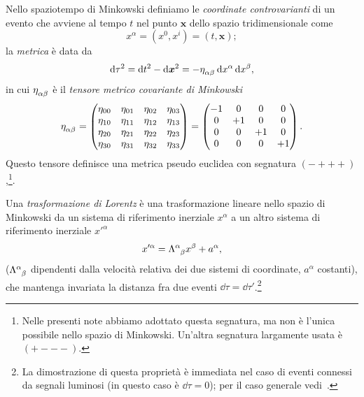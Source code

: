 Nello spaziotempo di Minkowski definiamo le
\emph{coordinate controvarianti} di un evento
che avviene al tempo $t$ nel punto $\bm{x}$ dello spazio tridimensionale come
\begin{equation}
  \label{eq:coord-controvariante}
  x^{\alpha} = (x^{0},x^{i}) = (t, \bm{x});
\end{equation}
la \emph{metrica} è data da
\begin{equation}
  \dd \tau^{2} = \dd t^{2} - \dd \bm{x}^{2} = -\tensor{\eta}{_{\alpha\beta}}\dd
  x^{\alpha} \dd x^{\beta},
\end{equation}
in cui $\tensor{\eta}{_{\alpha\beta}}$ è il
\emph{tensore metrico covariante di
  Minkowski}
\begin{equation}
  \label{eq:tensore-metrico-controvariante}
  \tensor{\eta}{_{\alpha\beta}} =
  \begin{pmatrix}
   \eta_{00} & \eta_{01} & \eta_{02} & \eta_{03} \\
   \eta_{10} & \eta_{11} & \eta_{12} & \eta_{13} \\
   \eta_{20} & \eta_{21} & \eta_{22} & \eta_{23} \\
   \eta_{30} & \eta_{31} & \eta_{32} & \eta_{33}
  \end{pmatrix}
  =
  \begin{pmatrix}
    -1 & 0  & 0  & 0 \\
    0  & +1 & 0  & 0 \\
    0  & 0  & +1 & 0 \\
    0  & 0  & 0  & +1
  \end{pmatrix}.
\end{equation}
Questo tensore definisce una metrica pseudo euclidea con segnatura
$(-+++)$,\footnote{Nelle presenti note abbiamo adottato questa segnatura, ma non
  è l'unica possibile nello spazio di Minkowski.  Un'altra segnatura largamente
  usata è $(+---)$.}.

Una \emph{trasformazione di Lorentz} è
una trasformazione lineare nello spazio di Minkowski da un sistema di
riferimento inerziale $x^{\alpha}$ a un altro sistema di
riferimento inerziale $x'^{\alpha}$
\begin{equation}
  \label{eq:trasformazione-lineare}
  x'^{\alpha} = \tensor{\Lambda}{^{\alpha}_{\beta}}x^{\beta} + a^{\alpha},
\end{equation}
($\tensor{\Lambda}{^{\alpha}_{\beta}}$ dipendenti dalla velocità relativa dei
due sistemi di coordinate, $a^{\alpha}$ costanti), che mantenga invariata la
distanza fra due eventi $\dd\tau = \dd\tau'$.\footnote{La dimostrazione di
  questa proprietà è immediata nel caso di eventi connessi da segnali luminosi
  (in questo caso è $\dd\tau=0$); per il caso generale
  vedi~\textcite[34-37]{barone:relativita}.}

